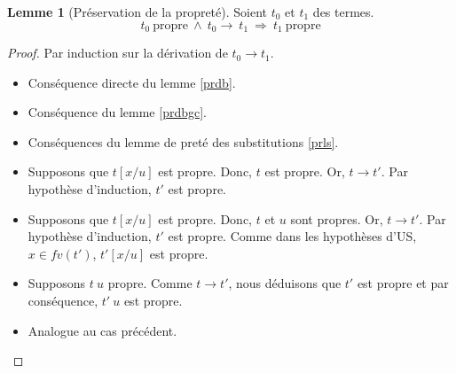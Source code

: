 \documentclass[11pt,a4paper]{article}
\theoremstyle{definition}
\newtheorem{lemma}[theorem]{Lemme}
\begin{document}
\begin{lemma}[Préservation de la propreté]
  Soient $t_0$ et $t_1$ des termes. 
  \[
    t_0~\text{propre}~\wedge~t_0\rightarrow~t_1~\Rightarrow~t_1~\text{propre}
  \]
\end{lemma}
\begin{proof}
  Par induction sur la dérivation de $t_0 \rightarrow t_1$.
  \begin{itemize}
    \item {} Conséquence directe du lemme \ref{prdb}. 
    \item {} Conséquence du lemme \ref{prdbgc}. 
    \item {} Conséquences du lemme de preté des substitutions \ref{prls}.
    \item {} Supposons que $t[x/u]$ est propre. Donc, $t$ est propre. Or, $t \rightarrow t'$. Par hypothèse d'induction, $t'$ est propre.
    \item {} Supposons que $t[x/u]$ est propre. Donc, $t$ et $u$ sont propres. Or, $t \rightarrow t'$. Par hypothèse d'induction, $t'$ est propre.
      Comme dans les hypothèses d'US, $x \in fv(t')$, $t'[x/u]$ est propre.
    \item {} Supposons $t~u$ propre. Comme $t \rightarrow t'$, nous déduisons que $t'$ est propre et par conséquence, $t'~u$ est propre.
    \item {} Analogue au cas précédent.
  \end{itemize}
\end{proof}
\end{document}
